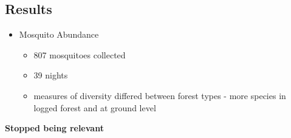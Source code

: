 \subsection*{Results}
\begin{itemize}
	\item Mosquito Abundance
	\begin{itemize}
		\item 807 mosquitoes collected
		\item 39 nights
		\item measures of diversity differed between forest types - more species in logged forest and at ground level
	\end{itemize}
\end{itemize}

\textbf{Stopped being relevant}
